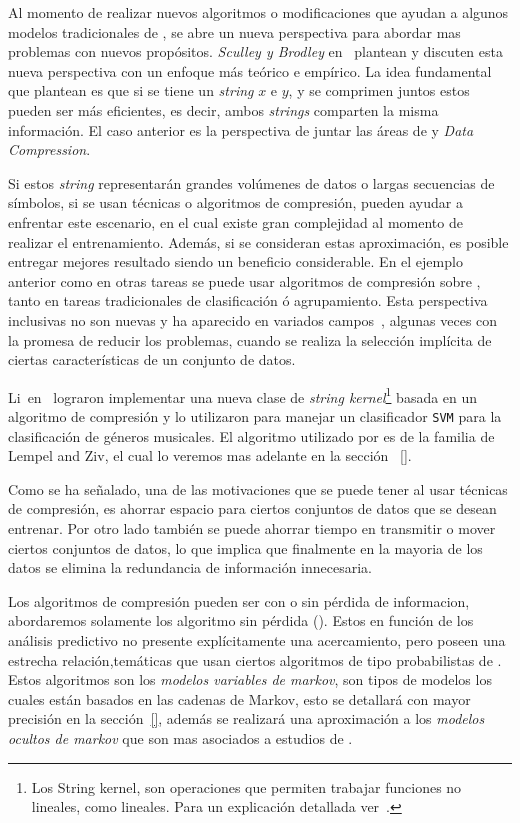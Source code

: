 Al momento de realizar nuevos algoritmos o modificaciones que ayudan a algunos modelos tradicionales de \machinelearning, se abre un nueva perspectiva para abordar mas problemas con nuevos propósitos. \emph{Sculley y Brodley} en~\cite{Sculley2006} plantean y discuten esta nueva perspectiva con un enfoque más teórico e empírico. La idea fundamental que plantean es que si se tiene un \emph{string} $x$ e $y$, y  se comprimen juntos estos pueden ser más eficientes, es decir,  ambos \emph{strings} comparten la misma información. El caso anterior es la perspectiva de juntar las áreas de \machinelearning y \emph{Data Compression}. 

Si estos \emph{string} representarán grandes volúmenes de datos o largas secuencias de símbolos, si se usan técnicas o algoritmos de compresión, pueden ayudar a enfrentar este escenario, en el cual existe gran complejidad al momento de realizar el entrenamiento. Además, si se consideran estas aproximación, es posible entregar mejores resultado siendo  un beneficio considerable. En el ejemplo anterior como en otras tareas se puede usar algoritmos de compresión sobre \machinelearning, tanto en tareas tradicionales de clasificación ó agrupamiento.  Esta perspectiva inclusivas no son nuevas y ha aparecido en variados campos~\cite{Sculley2006}, algunas veces con la promesa de reducir los problemas, cuando se realiza la selección implícita de ciertas características de un conjunto de datos. 

Li~\etal en~\cite{Li2005} lograron implementar una nueva clase de \emph{string kernel}\footnote{Los String kernel, son operaciones que permiten trabajar funciones no lineales, como lineales. Para un explicación detallada ver~\cite{Li2005}.} basada en un algoritmo de compresión y lo utilizaron para manejar un clasificador \texttt{SVM} para la clasificación de géneros musicales. El algoritmo utilizado por \cite{Sculley2006} es de la familia de {Lempel and Ziv}, el cual lo veremos mas adelante en la sección ~\ref{}.

Como se ha señalado, una de las motivaciones que se puede tener al usar técnicas de compresión, es ahorrar espacio para ciertos conjuntos de datos que se desean entrenar. Por otro lado también se puede ahorrar tiempo en transmitir o mover ciertos conjuntos de datos, lo que implica que finalmente en la mayoria de los datos se elimina la redundancia de información innecesaria.

Los algoritmos de compresión pueden ser con o sin pérdida de informacion, abordaremos solamente los algoritmo sin pérdida (\losslessdatacompression). Estos en función de los análisis predictivo no presente explícitamente una acercamiento, pero poseen una estrecha relación,temáticas que usan ciertos algoritmos de tipo probabilistas de \machinelearning. Estos algoritmos son los \emph{modelos variables de markov}, son tipos de modelos los cuales están basados en las cadenas de Markov, esto se detallará con mayor precisión en la sección~\ref{}, además se realizará una aproximación a los \emph{modelos ocultos de markov} que son mas asociados a estudios de \machinelearning.





